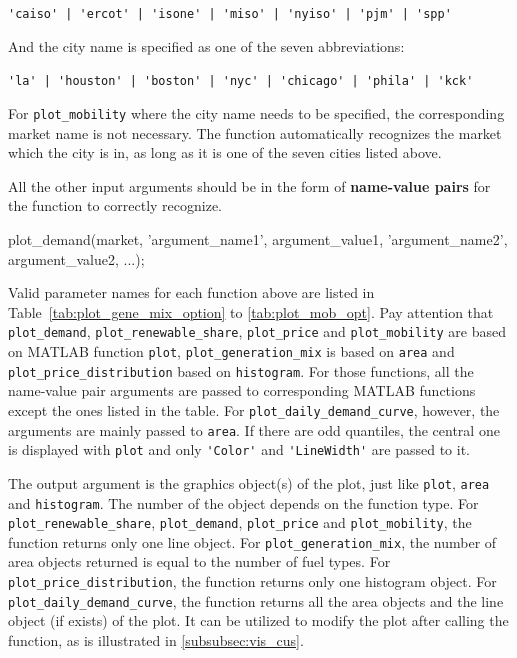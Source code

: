 \documentclass[11pt]{article}
\newcommand{\matlab}{\textsc{MATLAB}}
\numberwithin{equation}{section}
\numberwithin{table}{section}
\numberwithin{figure}{section}
\begin{document}
\begin{center}
  \verb!'caiso' | 'ercot' | 'isone' | 'miso' | 'nyiso' | 'pjm' | 'spp'!
\end{center}

And the city name is specified as one of the seven abbreviations:

\begin{center}
  \verb!'la' | 'houston' | 'boston' | 'nyc' | 'chicago' | 'phila' | 'kck'!
\end{center}

For \verb!plot_mobility! where the city name needs to be specified, the corresponding market name is not necessary. The function automatically recognizes the market which the city is in, as long as it is one of the seven cities listed above.

All the other input arguments should be in the form of \textbf{name-value pairs} for the function to correctly recognize.

\begin{Code}
  plot_demand(market, 'argument_name1', argument_value1,
  'argument_name2', argument_value2, ...);
\end{Code}

Valid parameter names for each function above are listed in Table~\ref{tab:plot_gene_mix_option} to \ref{tab:plot_mob_opt}. Pay attention that \verb!plot_demand!, \verb!plot_renewable_share!, \verb!plot_price! and \verb!plot_mobility! are based on \matlab{} function \verb!plot!, \verb!plot_generation_mix! is based on \verb!area! and \verb!plot_price_distribution! based on \verb!histogram!. For those functions, all the name-value pair arguments are passed to corresponding \matlab{} functions except the ones listed in the table. For \verb!plot_daily_demand_curve!, however, the arguments are mainly passed to \verb!area!. If there are odd quantiles, the central one is displayed with \verb!plot! and only \verb!'Color'! and \verb!'LineWidth'! are passed to it.

The output argument is the graphics object(s) of the plot, just like \verb!plot!, \verb!area! and \verb!histogram!. The number of the object depends on the function type. For \verb!plot_renewable_share!, \verb!plot_demand!, \verb!plot_price! and \verb!plot_mobility!, the function returns only one line object. For \verb!plot_generation_mix!, the number of area objects returned is equal to the number of fuel types. For \verb!plot_price_distribution!, the function returns only one histogram object. For \verb!plot_daily_demand_curve!, the function returns all the area objects and the line object (if exists) of the plot. It can be utilized to modify the plot after calling the function, as is illustrated in \ref{subsubsec:vis_cus}.
\end{document}
